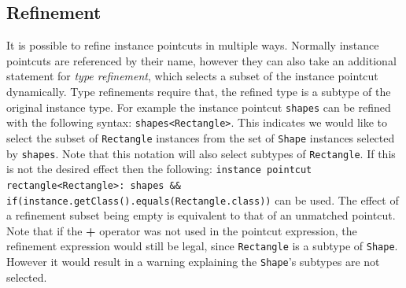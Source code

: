 \documentclass{llncs}
\begin{document}
%

\subsection{Refinement} 
It is possible to refine instance pointcuts in multiple ways. Normally instance pointcuts are referenced by their name, however they can also take an additional statement for \emph{type refinement}, which selects a subset of the instance pointcut dynamically. Type refinements require that, the refined type is a subtype of the original instance type. For example the instance pointcut \texttt{shapes} can be refined with the following syntax: \lstinline!shapes<Rectangle>!. This indicates we would like to select the subset of \texttt{Rectangle} instances from the set of \texttt{Shape} instances selected by \texttt{shapes}. Note that this notation will also select subtypes of \texttt{Rectangle}. If this is not the desired effect then the following: \lstinline!instance pointcut rectangle<Rectangle>: shapes && if(instance.getClass().equals(Rectangle.class))! can be used. The effect of a refinement subset being empty is equivalent to that of an unmatched pointcut. Note that if the \textbf{+} operator was not used in the pointcut expression, the refinement expression would still be legal, since \texttt{Rectangle} is a subtype of \texttt{Shape}. However it would result in a warning explaining the \texttt{Shape}'s subtypes are not selected.
\end{document}
